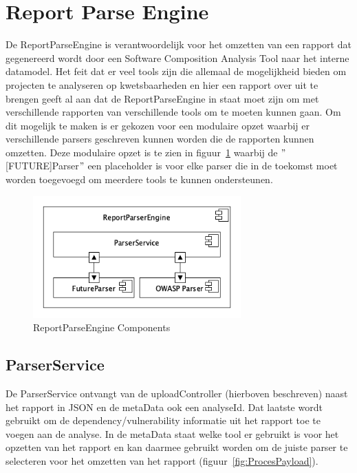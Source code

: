 \section{Report Parse Engine}\label{sec:report-parse-engine}
De ReportParseEngine is verantwoordelijk voor het omzetten van een rapport dat gegenereerd wordt door een Software Composition Analysis Tool naar het interne datamodel. Het feit dat er veel tools zijn die allemaal de mogelijkheid bieden om projecten te analyseren op kwetsbaarheden en hier een rapport over uit te brengen geeft al aan dat de ReportParseEngine in staat moet zijn om met verschillende rapporten van verschillende tools om te moeten kunnen gaan. Om dit mogelijk te maken is er gekozen voor een modulaire opzet waarbij er verschillende parsers geschreven kunnen worden die de rapporten kunnen omzetten. Deze modulaire opzet is te zien in figuur~\ref{fig:ReportParseComponents} waarbij de $"$[FUTURE]Parser$"$ een placeholder is voor elke parser die in de toekomst moet worden toegevoegd om meerdere tools te kunnen ondersteunen.
\begin{figure}[bth]
    \myfloatalign
    \includegraphics[width=8cm]{gfx/umlet/exports/ReportParserComponents}
    \caption{ReportParseEngine Components}
    \label{fig:ReportParseComponents}
\end{figure}

\subsection{ParserService}\label{subsec:reportservice}
De ParserService ontvangt van de uploadController (hierboven beschreven) naast het rapport in JSON en de metaData ook een analyseId. Dat laatste wordt gebruikt om de dependency/vulnerability informatie uit het rapport toe te voegen aan de analyse. In de metaData staat welke tool er gebruikt is voor het opzetten van het rapport en kan daarmee gebruikt worden om de juiste parser te selecteren voor het omzetten van het rapport (figuur~\ref{fig:ProcesPayload}).


